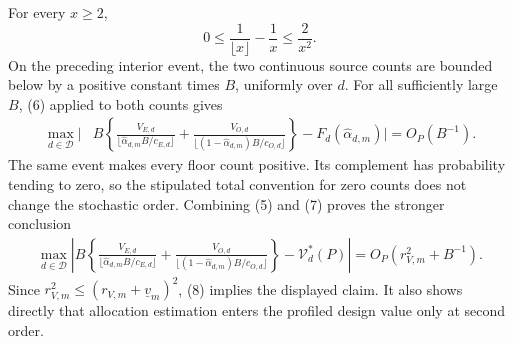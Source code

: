 For every \(x\ge2\),
\[
 0\le\frac1{\lfloor x\rfloor}-\frac1x
 \le\frac2{x^2}.
 \tag{6}
\]
On the preceding interior event, the two continuous source counts are bounded below by a positive constant times \(B\), uniformly over \(d\).  For all sufficiently large \(B\), (6) applied to both counts gives
\[
\begin{aligned}
 \max_{d\in\mathcal D}\Bigg|&B\left\{
 \frac{V_{E,d}}{\lfloor\widehat\alpha_{d,m}B/c_{E,d}\rfloor}
 +\frac{V_{O,d}}{\lfloor(1-\widehat\alpha_{d,m})B/c_{O,d}\rfloor}
 \right\}
 -F_d(\widehat\alpha_{d,m})\Bigg|
 =O_P(B^{-1}).
\end{aligned}
 \tag{7}
\]
The same event makes every floor count positive.  Its complement has probability tending to zero, so the stipulated total convention for zero counts does not change the stochastic order.  Combining (5) and (7) proves the stronger conclusion
\[
\begin{aligned}
 \max_{d\in\mathcal D}\left|B\left\{
 \frac{V_{E,d}}{\lfloor\widehat\alpha_{d,m}B/c_{E,d}\rfloor}
 +\frac{V_{O,d}}{\lfloor(1-\widehat\alpha_{d,m})B/c_{O,d}\rfloor}
 \right\}-\mathcal V_d^*(P)\right|
 =O_P(r_{V,m}^2+B^{-1}).
\end{aligned}
 \tag{8}
\]
Since \(r_{V,m}^2\le(r_{V,m}+\underline v_m)^2\), (8) implies the displayed claim.  It also shows directly that allocation estimation enters the profiled design value only at second order.